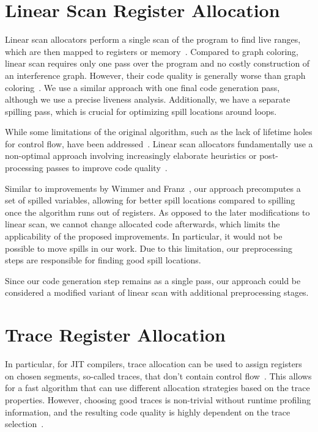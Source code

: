 \section{Linear Scan Register Allocation}
Linear scan allocators perform a single scan of the program to find live ranges, which are then mapped to registers or memory~\cite{linear-scan-og}.
Compared to graph coloring, linear scan requires only one pass over the program and no costly construction of an interference graph. However, their code quality is generally worse than graph coloring~\cite{hack-thesis}.
We use a similar approach with one final code generation pass, although we use a precise liveness analysis. Additionally, we have a separate spilling pass, which is crucial for optimizing spill locations around loops.

While some limitations of the original algorithm, such as the lack of lifetime holes for control flow, have been addressed~\cite{Wimmer2010}. 
Linear scan allocators fundamentally use a non-optimal approach involving increasingly elaborate heuristics or post-processing passes to improve code quality~\cite{Wimmer2010}.

Similar to improvements by Wimmer and Franz~\cite{Wimmer2010}, our approach precomputes a set of spilled variables, allowing for better spill locations compared to spilling once the algorithm runs out of registers. As opposed to the later modifications to linear scan, we cannot change allocated code afterwards, which limits the applicability of the proposed improvements. In particular,  it would not be possible to move spills in our work.
Due to this limitation, our preprocessing steps are responsible for finding good spill locations. 

Since our code generation step remains as a single pass, our approach could be considered a modified variant of linear scan with additional preprocessing stages.

\section{Trace Register Allocation}
In particular, for JIT compilers, trace allocation can be used to assign registers on chosen segments, so-called traces, that don't contain control flow~\cite{trace-ra}. This allows for a fast algorithm that can use different allocation strategies based on the trace properties. 
However, choosing good traces is non-trivial without runtime profiling information, and the resulting code quality is highly dependent on the trace selection~\cite{trace-ra}.

